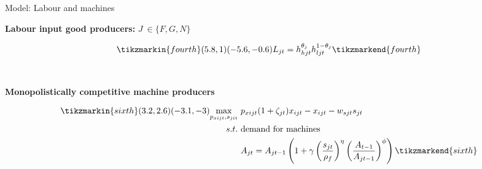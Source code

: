 \documentclass[11pt,aspectratio=169]{beamer}
\begin{document}
\begin{frame}{Model: Labour and machines}
	
	\textbf{Labour input good producers:} $J\ \in\{F,G,N\}$\\ \vspace{3mm}
	\begin{minipage}[t!]{1\textwidth}
		\begin{align*}
		\tikzmarkin{fourth}(5.8,1)(-5.6,-0.6)
		 L_{jt}=h_{hjt}^{\theta_{j}}h_{ljt}^{1-\theta_{j}}
		\tikzmarkend{fourth}
		\end{align*}
	\end{minipage}
\\
\pause

\vspace{10mm}
	\textbf{Monopolistically competitive machine producers }\\ \vspace{-1mm}
\begin{minipage}[t!]{1\textwidth}
	\begin{align*}
	\tikzmarkin{sixth}(3.2,2.6)(-3.1,-3)
\underset{p_{xijt}, s_{jit}}{\max}\ & p_{xijt}(1+\zeta_{jt})x_{ijt}-x_{ijt}-w_{sjt}s_{jt}\\
s.t.\ & \text{demand for machines }\\ %
& A_{jt}=A_{jt-1}\left(1+\gamma\left(\frac{s_{jt}}{\rho_f}\right)^\eta\left(\frac{A_{t-1}}{A_{jt-1}}\right)^\phi\right)
	\tikzmarkend{sixth}
	\end{align*}
\end{minipage}
\end{frame}
%
\end{document}
